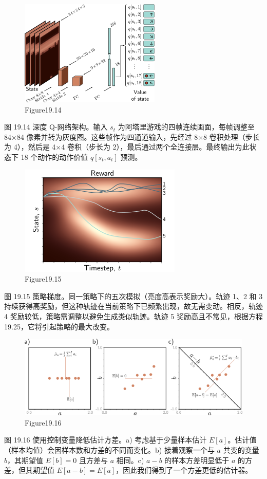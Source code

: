 \begin{figure}[h!]
\centering
\includegraphics[width=0.7\linewidth]{png/chapter19/ReinforceDQL2.png}
\caption{Figure19.14}
\end{figure}
图 19.14 深度 Q-网络架构。输入 \(s_t\) 为阿塔里游戏的四帧连续画面，每帧调整至 84×84 像素并转为灰度图。这些帧作为四通道输入，先经过 8×8 卷积处理（步长为 4），然后是 4×4 卷积（步长为 2），最后通过两个全连接层。最终输出为此状态下 18 个动作的动作价值 \(q[s_t, a_t]\) 预测。

\begin{figure}[h!]
\centering
\includegraphics[width=0.7\linewidth]{png/chapter19/ReinforcePolicyGrad.png}
\caption{Figure19.15}
\end{figure}
图 19.15 策略梯度。同一策略下的五次模拟（亮度高表示奖励大）。轨迹 1、2 和 3 持续获得高奖励，但这种轨迹在当前策略下已频繁出现，故无需变动。相反，轨迹 4 奖励较低，策略需调整以避免生成类似轨迹。轨迹 5 奖励高且不常见，根据方程 19.25，它将引起策略的最大改变。

\begin{figure}[h!]
\centering
\includegraphics[width=0.7\linewidth]{png/chapter19/ReinforcementVariance.png}
\caption{Figure19.16}
\end{figure}
图 19.16 使用控制变量降低估计方差。a) 考虑基于少量样本估计 \(E[a]\)。估计值（样本均值）会因样本数和方差的不同而变化。b) 接着观察一个与 \(a\) 共变的变量 \(b\)，其期望值 \(E[b] = 0\) 且方差与 \(a\) 相同。c) \(a - b\) 的样本方差明显低于 \(a\) 的方差，但其期望值 \(E[a - b] = E[a]\)，因此我们得到了一个方差更低的估计器。

